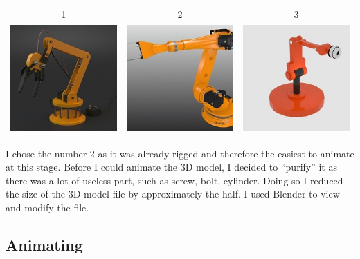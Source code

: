 \documentclass{scrartcl}
\begin{document}
\begin{center}
  \begin{tabular}{c c c}
    1 & 2 & 3 \\
    \includegraphics{industrial_robotic_arm} & \includegraphics{kuka} & \includegraphics{robotarm_cylinder}
  \end{tabular}
\end{center}
I chose the number 2 as it was already rigged and therefore the easiest to animate at this stage. 
Before I could animate the 3D model, I decided to “purify” it as there was a lot of useless part, such as screw, bolt, cylinder. 
Doing so I reduced the size of the 3D model file by approximately the half. I used Blender to view and modify the file.

\subsection{Animating}
\end{document}

